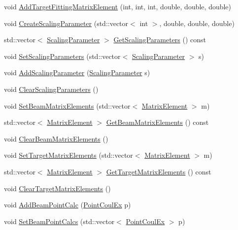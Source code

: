 \begin{DoxyCompactItemize}
void \hyperlink{classCoulExSimFitter_aaad08ace7ff19a3d647ba876ca6ff08c}{Add\-Target\-Fitting\-Matrix\-Element} (int, int, int, double, double, double)
\item 
void \hyperlink{classCoulExSimFitter_a06aa31eb9c4dc51a2c69188373bf292d}{Create\-Scaling\-Parameter} (std\-::vector$<$ int $>$, double, double, double)
\item 
std\-::vector$<$ \hyperlink{classScalingParameter}{Scaling\-Parameter} $>$ \hyperlink{classCoulExSimFitter_a32c580e2ffe931a6bfa0e1bea293aca3}{Get\-Scaling\-Parameters} () const 
\item 
void \hyperlink{classCoulExSimFitter_a89e43cd4897b5c56580db7852cbc2d37}{Set\-Scaling\-Parameters} (std\-::vector$<$ \hyperlink{classScalingParameter}{Scaling\-Parameter} $>$ s)
\item 
void \hyperlink{classCoulExSimFitter_a2f5dbaabd2d30726a12ccdbf225261c3}{Add\-Scaling\-Parameter} (\hyperlink{classScalingParameter}{Scaling\-Parameter} s)
\item 
void \hyperlink{classCoulExSimFitter_a84d8c24a786ab8c3201f864190574be5}{Clear\-Scaling\-Parameters} ()
\item 
void \hyperlink{classCoulExSimFitter_a01c682e2e9a1e84d8c3a977fb1d6e1a8}{Set\-Beam\-Matrix\-Elements} (std\-::vector$<$ \hyperlink{classMatrixElement}{Matrix\-Element} $>$ m)
\item 
std\-::vector$<$ \hyperlink{classMatrixElement}{Matrix\-Element} $>$ \hyperlink{classCoulExSimFitter_a0a1e5ccae924c97fdb497c43d62fe609}{Get\-Beam\-Matrix\-Elements} () const 
\item 
void \hyperlink{classCoulExSimFitter_ae4ba8e01614d5f3d50a22abb74dd4e8a}{Clear\-Beam\-Matrix\-Elements} ()
\item 
void \hyperlink{classCoulExSimFitter_a1ecc0eecc268545044e3f73c26eb00a6}{Set\-Target\-Matrix\-Elements} (std\-::vector$<$ \hyperlink{classMatrixElement}{Matrix\-Element} $>$ m)
\item 
std\-::vector$<$ \hyperlink{classMatrixElement}{Matrix\-Element} $>$ \hyperlink{classCoulExSimFitter_ae7dca1a0f23e15d332a4141fd09a2ed3}{Get\-Target\-Matrix\-Elements} () const 
\item 
void \hyperlink{classCoulExSimFitter_a8ecb42674aefdf6dee9779144ec5915e}{Clear\-Target\-Matrix\-Elements} ()
\item 
void \hyperlink{classCoulExSimFitter_a3cd07b08eaf376346bc36be2cab2b0af}{Add\-Beam\-Point\-Calc} (\hyperlink{classPointCoulEx}{Point\-Coul\-Ex} p)
\item 
void \hyperlink{classCoulExSimFitter_a6fd0a37afe00943badaa5dd3aa006265}{Set\-Beam\-Point\-Calcs} (std\-::vector$<$ \hyperlink{classPointCoulEx}{Point\-Coul\-Ex} $>$ p)

\end{DoxyCompactItemize}
